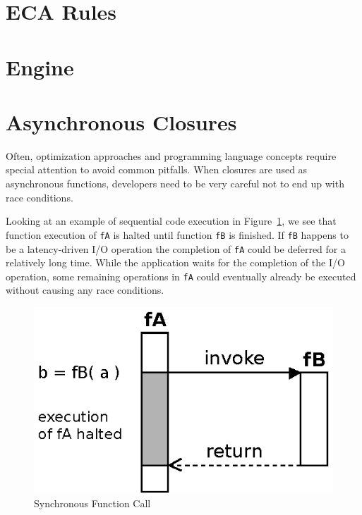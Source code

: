\section{ECA Rules}





\section{Engine}






\section{Asynchronous Closures}
%


Often, optimization approaches and programming language concepts require special attention to avoid common pitfalls.
When closures are used as asynchronous functions, developers need to be very careful not to end up with race conditions.


Looking at an example of sequential code execution in Figure~\ref{fig:Closures_Synchronous}, we see that function execution of \texttt{fA} is halted until function \texttt{fB} is finished.
If \texttt{fB} happens to be a latency-driven I/O operation the completion of \texttt{fA} could be deferred for a relatively long time.
While the application waits for the completion of the I/O operation, some remaining operations in \texttt{fA} could eventually already be executed without causing any race conditions.
\begin{figure}[!ht]
	\centering
  \includegraphics{figures/Closures_Synchronous}
	\caption{Synchronous Function Call}
	\label{fig:Closures_Synchronous}
\end{figure}


